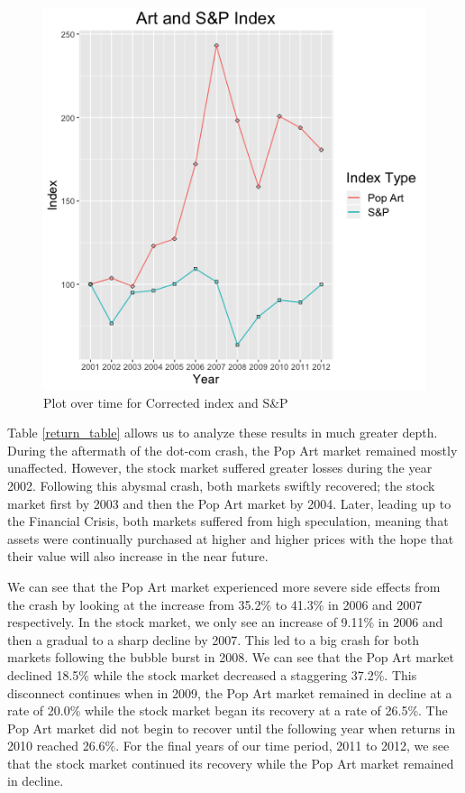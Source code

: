 \documentclass[]{asaproc}\usepackage[]{graphicx}\usepackage[]{color}
\begin{document}
\begin{figure}[!ht]

\includegraphics[scale = 0.5]{index}
\caption{Plot over time for Corrected index and S\&P}
\label{index_plot}
\end{figure}

Table \ref{return_table} allows us to analyze these results in much greater depth. During the aftermath of the dot-com crash, the Pop Art market remained mostly unaffected. However, the stock market suffered greater losses during the year 2002. Following this abysmal crash, both markets swiftly recovered; the stock market first by 2003 and then the Pop Art market by 2004. Later, leading up to the Financial Crisis, both markets suffered from high speculation, meaning that assets were continually purchased at higher and higher prices with the hope that their value will also increase in the near future.

We can see that the Pop Art market experienced more severe side effects from the crash by looking at the increase from 35.2\% to 41.3\% in 2006 and 2007 respectively. In the stock market, we only see an increase of 9.11\% in 2006 and then a gradual to a sharp decline by 2007. This led to a big crash for both markets following the bubble burst in 2008. We can see that the Pop Art market declined 18.5\% while the stock market decreased a staggering 37.2\%. This disconnect continues when in 2009, the Pop Art market remained in decline at a rate of 20.0\% while the stock market began its recovery at a rate of 26.5\%.
The Pop Art market did not begin to recover until the following year when returns in 2010 reached 26.6\%. For the final years of our time period, 2011 to 2012, we see that the stock market continued its recovery while the Pop Art market remained in decline. 
\end{document}
